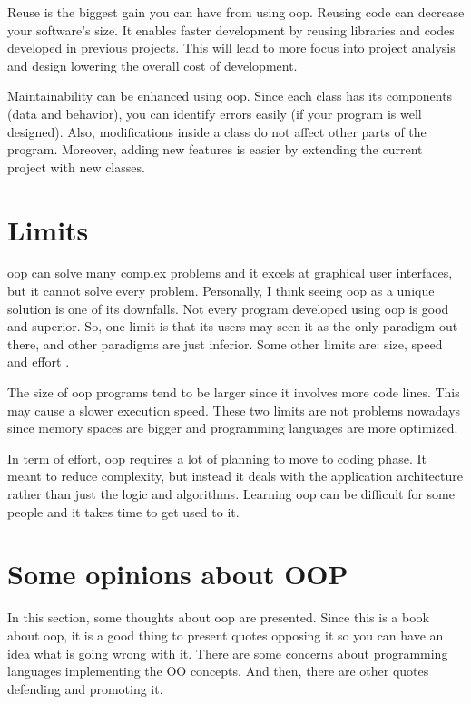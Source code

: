 \documentclass[12pt]{KodeBookAr}
\begin{document}
Reuse is the biggest gain you can have from using \ac{oop}. 
Reusing code can decrease your software's size. 
It enables faster development by reusing libraries and codes developed in previous projects. 
This will lead to more focus into project analysis and design lowering the overall cost of development. 

Maintainability can be enhanced using \ac{oop}. 
Since each class has its components (data and behavior), you can identify errors easily (if your program is well designed).
Also, modifications inside a class do not affect other parts of the program. 
Moreover, adding new features is easier by extending the current project with new classes.

\section{Limits}

\ac{oop} can solve many complex problems and it excels at graphical user interfaces, but it cannot solve every problem. 
Personally, I think seeing \ac{oop} as a unique solution is one of its downfalls. 
Not every program developed using \ac{oop} is good and superior. 
So, one limit is that its users may seen it as the only paradigm out there, and other paradigms are just inferior.
Some other limits are: size, speed and effort \citep{2015-popyack-boady}.

The size of \ac{oop} programs tend to be larger since it involves more code lines. 
This may cause a slower execution speed. 
These two limits are not problems nowadays since memory spaces are bigger and programming languages are more optimized.

In term of effort, \ac{oop} requires a lot of planning to move to coding phase.
It meant to reduce complexity, but instead it deals with the application architecture rather than just the logic and algorithms.
Learning \ac{oop} can be difficult for some people and it takes time to get used to it.

\section{Some opinions about OOP}

In this section, some thoughts about \ac{oop} are presented. 
Since this is a book about \ac{oop}, it is a good thing to present quotes opposing it \citep{2016-yegor} so you can have an idea what is going wrong with it. 
There are some concerns about programming languages implementing the OO concepts. 
And then, there are other quotes defending and promoting it.
\end{document}
